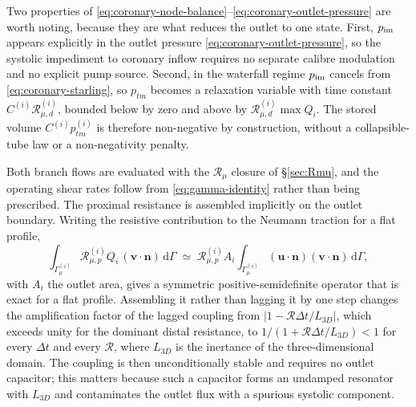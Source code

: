 \documentclass[lineno]{jfm}
\begin{document}
Two properties of \eqref{eq:coronary-node-balance}--\eqref{eq:coronary-outlet-pressure}
are worth noting, because they are what reduces the outlet to one state. First,
$p_{\rm im}$ appears explicitly in the outlet pressure
\eqref{eq:coronary-outlet-pressure}, so the systolic impediment to coronary
inflow requires no separate calibre modulation and no explicit pump source.
Second, in the waterfall regime $p_{\rm im}$ cancels from
\eqref{eq:coronary-starling}, so $p_{tm}$ becomes a relaxation variable with
time constant $C^{(i)}\mathcal{R}_{\mu,d}^{(i)}$, bounded below by zero and above
by $\mathcal{R}_{\mu,d}^{(i)}\max Q_i$. The stored volume $C^{(i)}p_{tm}^{(i)}$ is
therefore non-negative by construction, without a collapsible-tube law or a
non-negativity penalty.

Both branch flows are evaluated with the $\mathcal{R}_{\mu}$ closure of
\S\ref{sec:Rmu}, and the operating shear rates follow from
\eqref{eq:gamma-identity} rather than being prescribed. The proximal resistance is
assembled implicitly on the outlet boundary. Writing the resistive contribution to
the Neumann traction for a flat profile,
\begin{equation}
\int_{\Gamma_\mu^{(i)}}\!\mathcal{R}_{\mu,p}^{(i)}Q_i\,(\boldsymbol{v}\cdot\boldsymbol{n})
\,\mathrm{d}\Gamma
\;\simeq\;
\mathcal{R}_{\mu,p}^{(i)}A_i
\int_{\Gamma_\mu^{(i)}}\!(\boldsymbol{u}\cdot\boldsymbol{n})
(\boldsymbol{v}\cdot\boldsymbol{n})\,\mathrm{d}\Gamma ,
\label{eq:coronary-implicit-resistance}
\end{equation}
with $A_i$ the outlet area, gives a symmetric positive-semidefinite operator that
is exact for a flat profile. Assembling it rather than lagging it by one step
changes the amplification factor of the lagged coupling from
$|1-\mathcal{R}\Delta t/L_{3D}|$, which exceeds unity for the dominant distal
resistance, to $1/(1+\mathcal{R}\Delta t/L_{3D})<1$ for every $\Delta t$ and every
$\mathcal{R}$, where $L_{3D}$ is the inertance of the three-dimensional domain.
The coupling is then unconditionally stable and requires no outlet capacitor; this
matters because such a capacitor forms an undamped resonator with $L_{3D}$ and
contaminates the outlet flux with a spurious systolic component.
\end{document}
